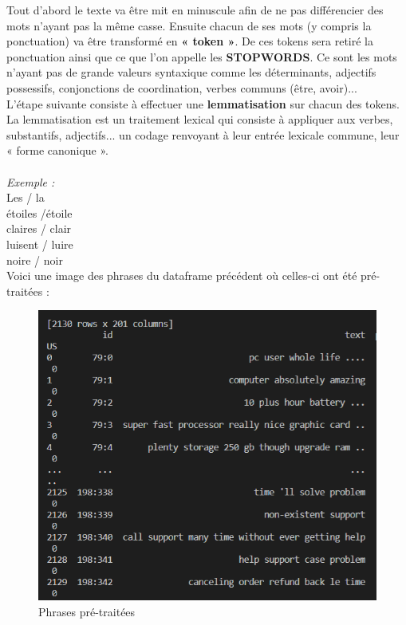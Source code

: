 \documentclass[12pt ,a4paper ]{article}
\begin{document}
\begin{multicols}{2}
\noindent Tout d'abord le texte va être mit en minuscule afin de ne pas différencier des mots n'ayant pas la même casse. Ensuite chacun de ses mots (y compris la ponctuation) va être transformé en \textbf{« token »}. De ces tokens sera retiré la ponctuation ainsi que ce que l'on appelle les \textbf{STOPWORDS}. Ce sont les mots n'ayant pas de grande valeurs syntaxique comme les déterminants, adjectifs possessifs, conjonctions de coordination, verbes communs (être, avoir)...\\

\noindent L'étape suivante consiste à effectuer une \textbf{lemmatisation} sur chacun des tokens. La lemmatisation est un traitement lexical qui consiste à appliquer aux verbes, substantifs, adjectifs... un codage renvoyant à leur entrée lexicale commune, leur « forme canonique ».\\\\

\noindent \textit{Exemple :}\\
Les / la\\
étoiles /étoile\\
claires / clair\\
luisent / luire\\
noire / noir\\

\noindent Voici une image des phrases du dataframe précédent où celles-ci ont été pré-traitées : 
\begin{figure}[H]
    \begin{center}
        \includegraphics[scale=0.62]{pretrait_dataf.png}
    \end{center}
\caption{\small{Phrases pré-traitées}}
\end{figure}


\end{multicols}
\end{document}
